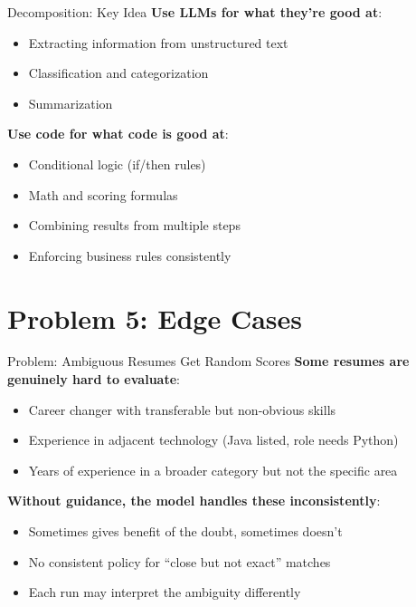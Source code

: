 \documentclass[aspectratio=169]{beamer}
\begin{document}
\begin{frame}{Decomposition: Key Idea}
\textbf{Use LLMs for what they're good at}:
\begin{itemize}
    \item Extracting information from unstructured text
    \item Classification and categorization
    \item Summarization
\end{itemize}
\vspace{0.3cm}

\textbf{Use code for what code is good at}:
\begin{itemize}
    \item Conditional logic (if/then rules)
    \item Math and scoring formulas
    \item Combining results from multiple steps
    \item Enforcing business rules consistently
\end{itemize}
\vspace{0.3cm}

\begin{center}
\end{center}
\end{frame}

\section{Problem 5: Edge Cases}

\begin{frame}{Problem: Ambiguous Resumes Get Random Scores}
\textbf{Some resumes are genuinely hard to evaluate}:
\begin{itemize}
    \item Career changer with transferable but non-obvious skills
    \item Experience in adjacent technology (Java listed, role needs Python)
    \item Years of experience in a broader category but not the specific area
\end{itemize}
\vspace{0.3cm}

\textbf{Without guidance, the model handles these inconsistently}:
\begin{itemize}
    \item Sometimes gives benefit of the doubt, sometimes doesn't
    \item No consistent policy for ``close but not exact'' matches
    \item Each run may interpret the ambiguity differently
\end{itemize}
\end{frame}
\end{document}
